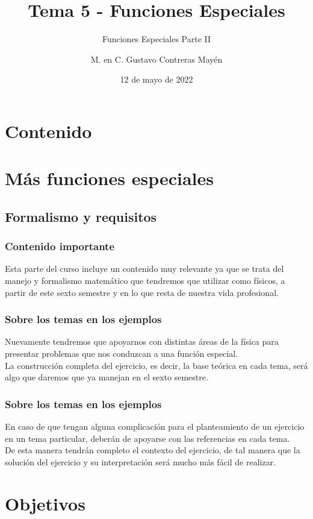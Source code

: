 \documentclass[12pt]{beamer}
\date{12 de mayo de 2022}
\title{\large{Tema 5 - Funciones Especiales}}
\subtitle{Funciones Especiales Parte II}
\author{M. en C. Gustavo Contreras Mayén}
\begin{document}
\maketitle
\fontsize{14}{14}\selectfont
{}

\section*{Contenido}

\section{Más funciones especiales}
\subsection{Formalismo y requisitos}

\begin{frame}
\frametitle{Contenido importante}
Esta parte del curso incluye un contenido muy relevante ya que se trata del manejo y formalismo matemático que tendremos que utilizar como físicos, a partir de este sexto semestre y en lo que resta de nuestra vida profesional.
\end{frame}
\begin{frame}
\frametitle{Sobre los temas en los ejemplos}
Nuevamente tendremos que apoyarnos con distintas áreas de la física para presentar problemas que nos conduzcan a una función especial.
\\
\bigskip
\pause
La construcción completa del ejercicio, es decir, la base teórica en cada tema, será algo que daremos que ya manejan en el sexto semestre.
\end{frame}
\begin{frame}
\frametitle{Sobre los temas en los ejemplos}
En caso de que tengan alguna complicación para el planteamiento de un ejercicio en un tema particular, deberán de apoyarse con las referencias en cada tema.
\\
\bigskip
\pause
De esta manera tendrán completo el contexto del ejercicio, de tal manera que la solución del ejercicio y su interpretación será mucho más fácil de realizar.
\end{frame}

\section{Objetivos}
\end{document}
